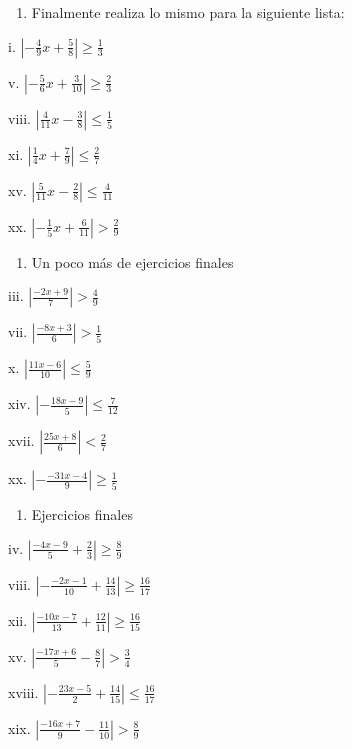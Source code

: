 \documentclass[]{book}
\providecommand{\tightlist}{%
  \setlength{\itemsep}{0pt}\setlength{\parskip}{0pt}}
\begin{document}
\begin{enumerate}
\def\labelenumi{\arabic{enumi}.}
\setcounter{enumi}{23}
\tightlist
\item
  Finalmente realiza lo mismo para la siguiente lista:
\end{enumerate}

\begin{multicols}{2}
i. $|{-\frac{4}{9}x+\frac{5}{8}}| \geq \frac{1}{3}$
    
v. $|{-\frac{5}{6}x+\frac{3}{10}}| \geq \frac{2}{3}$

viii. $|{\frac{4}{11}x-\frac{3}{8}}| \leq \frac{1}{5}$
    
xi. $|{\frac{1}{4}x+\frac{7}{9}}| \leq \frac{2}{7}$
    
xv. $|{\frac{5}{11}x-\frac{2}{8}}| \leq \frac{4}{11}$
    
xx. $|{-\frac{1}{5}x+\frac{6}{11}}| > \frac{2}{9}$
\end{multicols}

\begin{enumerate}
\def\labelenumi{\arabic{enumi}.}
\setcounter{enumi}{24}
\tightlist
\item
  Un poco más de ejercicios finales
\end{enumerate}

\begin{multicols}{2}
iii. $|\frac{-2x+9}{7}| > \frac{4}{9}$
 
vii. $|\frac{-8x+3}{6}| > \frac{1}{5}$
    
x. $|\frac{11x-6}{10}| \leq \frac{5}{9}$
    
xiv. $|-\frac{18x-9}{5}| \leq \frac{7}{12}$
 
xvii. $|\frac{25x+8}{6}| < \frac{2}{7}$
 
xx. $|-\frac{-31x-4}{9}| \geq \frac{1}{5}$
\end{multicols}

\begin{enumerate}
\def\labelenumi{\arabic{enumi}.}
\setcounter{enumi}{25}
\tightlist
\item
  Ejercicios finales
\end{enumerate}

\begin{multicols}{2}
iv. $|\frac{-4x-9}{5}+\frac{2}{3}| \geq \frac{8}{9}$
    
viii. $|-\frac{-2x-1}{10}+\frac{14}{13}| \geq \frac{16}{17}$

xii. $|\frac{-10x-7}{13}+\frac{12}{11}| \geq \frac{16}{15}$
    
xv. $|\frac{-17x+6}{5}-\frac{8}{7}| > \frac{3}{4}$
    
xviii. $|-\frac{23x-5}{2}+\frac{14}{15}| \leq \frac{16}{17}$
    
xix. $|\frac{-16x+7}{9}-\frac{11}{10}| > \frac{8}{9}$
\end{multicols}
\end{document}

